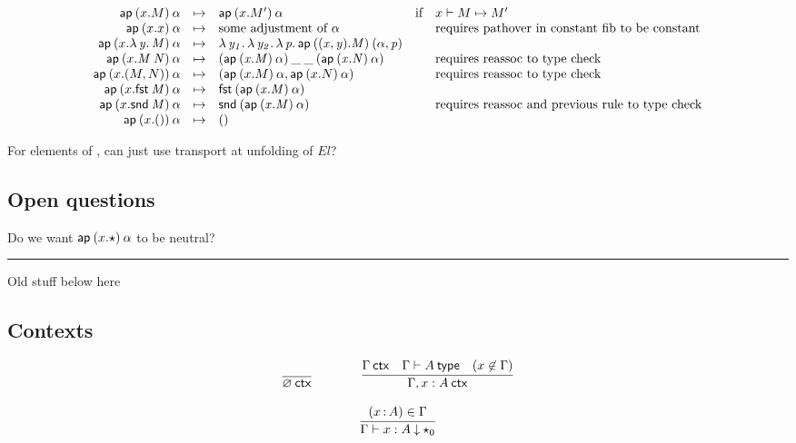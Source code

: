 \begin{small}
\[
\begin{array}{rclll}
\mathsf{ap} \: {(x.M)} \: {\alpha} & \mapsto & \mathsf{ap} \: {(x.M')} \: {\alpha} & \text{if} & x \vdash M \mapsto M'\\ 
\mathsf{ap} \: {(x.x)} \: {\alpha} & \mapsto & \text{some adjustment of $\alpha$} & & \text{requires pathover in constant fib to be constant}\\ 
\mathsf{ap} \: {(x.\mathit{\lambda\,y.\,M})} \: {\alpha} & \mapsto & \mathit{\lambda\,y_1.\,\mathit{\lambda\,y_2.\,\mathit{\lambda\,p.\,\mathsf{ap} \: {((x,y).M)} \: {(\alpha,p)}}}}\\
\mathsf{ap} \: {(x.\mathit{M \: N})} \: {\alpha} & \mapsto & \mathit{(\mathsf{ap} \: {(x.M)} \: {\alpha}) \: \_ \: \_ \: (\mathsf{ap} \: {(x.N)} \: {\alpha})} & &\text{requires reassoc to type check}\\ 
\mathsf{ap} \: {(x.(M,N))} \: {\alpha} & \mapsto & (\mathsf{ap} \: {(x.M)} \: {\alpha}, \mathsf{ap} \: {(x.N)} \: {\alpha}) & & \text{requires reassoc to type check}\\ 
\mathsf{ap} \: {(x.\mathit{\mathsf{fst} \: M})} \: {\alpha} & \mapsto & \mathit{\mathsf{fst} \: (\mathsf{ap} \: {(x.M)} \: {\alpha})} & & \\ 
\mathsf{ap} \: {(x.\mathit{\mathsf{snd} \: M})} \: {\alpha} & \mapsto & \mathit{\mathsf{snd} \: (\mathsf{ap} \: {(x.M)} \: {\alpha})} & & \text{requires reassoc and previous rule to type check}\\ 
\mathsf{ap} \: {(x.\mathsf{()})} \: {\alpha} & \mapsto & \mathsf{()} & \\ 
\end{array}
\]
\end{small}

For elements of \set, can just use transport at unfolding of $El$?  

\subsection{Open questions}

Do we want $\mathsf{ap} \: {(x.\star)} \: {\alpha}$ to be neutral?

\bigskip
\hrule
\bigskip

Old stuff below here

\subsection{Contexts}

\begin{small}
  \[
  \infer{\wfctx{\varnothing}}{}
  \qquad\qquad
  \infer{\wfctx{\Gamma,x:A}}
  {\wfctx{\Gamma}
    & \wftype{\Gamma}{A}
    & (x\not\in\Gamma)}
  \]

\[
\infer{\ofdepglob{\Gamma}{x}{A}{\unitglobelt 0}}{(\tptm xA)\in\Gamma}
\]
\end{small}


